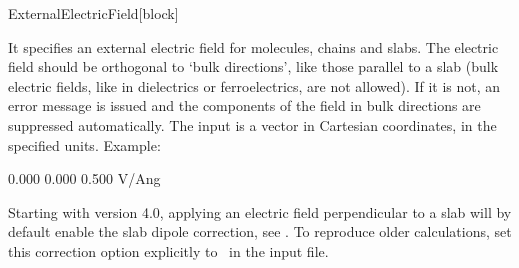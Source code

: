 \begin{fdfentry}{ExternalElectricField}[block]
  
  It specifies an external electric field for molecules, chains and
  slabs.  The electric field should be orthogonal to `bulk
  directions', like those parallel to a slab (bulk electric fields,
  like in dielectrics or ferroelectrics, are not allowed). If it is
  not, an error message is issued and the components of the field in
  bulk directions are suppressed automatically. The input is a vector
  in Cartesian coordinates, in the specified units. Example:
  \begin{fdfexample}
        0.000  0.000  0.500  V/Ang
  \end{fdfexample}

  Starting with version 4.0, applying an electric field perpendicular
  to a slab will by default enable the slab dipole correction, see
  . To reproduce older calculations, set
  this correction option explicitly to \fdffalse\ in the input file.

\end{fdfentry}

